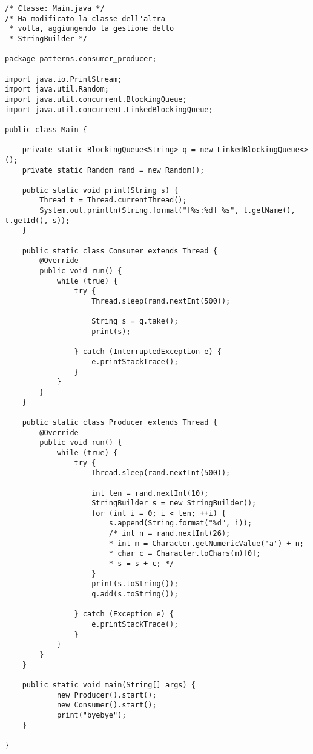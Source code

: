 \begin{lstlisting}
/* Classe: Main.java */
/* Ha modificato la classe dell'altra
 * volta, aggiungendo la gestione dello
 * StringBuilder */

package patterns.consumer_producer;

import java.io.PrintStream;
import java.util.Random;
import java.util.concurrent.BlockingQueue;
import java.util.concurrent.LinkedBlockingQueue;

public class Main {

    private static BlockingQueue<String> q = new LinkedBlockingQueue<>();
    private static Random rand = new Random();

    public static void print(String s) {
        Thread t = Thread.currentThread();
        System.out.println(String.format("[%s:%d] %s", t.getName(), t.getId(), s));
    }

    public static class Consumer extends Thread {
        @Override
        public void run() {
            while (true) {
                try {
                    Thread.sleep(rand.nextInt(500));

                    String s = q.take();
                    print(s);

                } catch (InterruptedException e) {
                    e.printStackTrace();
                }
            }
        }
    }

    public static class Producer extends Thread {
        @Override
        public void run() {
            while (true) {
                try {
                    Thread.sleep(rand.nextInt(500));

                    int len = rand.nextInt(10);
                    StringBuilder s = new StringBuilder();
                    for (int i = 0; i < len; ++i) {
                        s.append(String.format("%d", i));
						/* int n = rand.nextInt(26);
                        * int m = Character.getNumericValue('a') + n;
                        * char c = Character.toChars(m)[0];
                        * s = s + c; */
                    }
                    print(s.toString());
                    q.add(s.toString());

                } catch (Exception e) {
                    e.printStackTrace();
                }
            }
        }
    }

    public static void main(String[] args) {
            new Producer().start();
            new Consumer().start();
            print("byebye");
    }

}

\end{lstlisting}

















